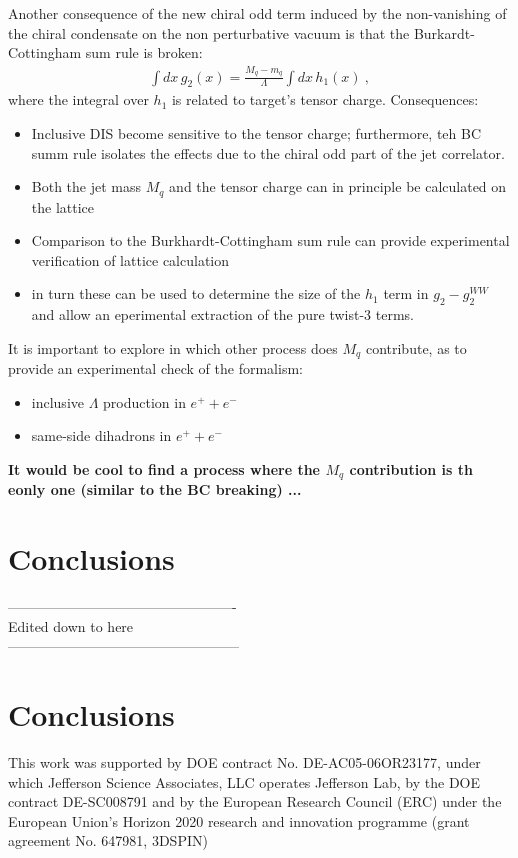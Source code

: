 \documentclass[preprintnumbers,floatfix,nofootinbib]{revtex4}
\newcommand{\todo}[1]{\marginpar{$\bullet$}\textbf{#1}}
\newcommand{\mj}{M_q}
\begin{document}
Another consequence of the new chiral odd term induced by the non-vanishing of
the chiral condensate on the non perturbative vacuum is that the
Burkardt-Cottingham sum rule is broken: 
\begin{align}
  \label{eq:BC}
  \int dx\, g_2(x) = \frac{\mj-m_q}{\Lambda} \int dx\, h_1(x) \ ,
\end{align}
where the integral over $h_1$ is related to target's tensor charge.
Consequences:
\begin{itemize}
\item Inclusive DIS become sensitive to the tensor charge; furthermore, teh BC summ rule isolates the effects due to the chiral odd part of the jet correlator. 
\item Both the jet mass $\mj$ and the tensor charge can in principle be calculated on the lattice
\item Comparison to the Burkhardt-Cottingham sum rule can provide experimental verification of lattice calculation
\item in turn these can be used to determine the size of the $h_1$ term in $g_2-g_2^{WW}$ and allow an eperimental extraction of the pure twist-3 terms.
\end{itemize}

It is important to explore in which other process does $\mj$ contribute, as to provide an experimental check of the formalism:
\begin{itemize}
\item inclusive $\Lambda$ production in $e^+ + e^-$
\item same-side dihadrons in $e^+ + e^-$ 
\end{itemize}
\todo{It would be cool to find a process where the $\mj$ contribution is th eonly one (similar to the BC breaking) ...}   


\section{Conclusions}

\noindent
------------------------------------------------- \\
Edited down to here\\
--------------------------------------------------\\


\section{Conclusions}



\begin{acknowledgments}
This work was supported by DOE contract No. DE-AC05-06OR23177,
under which Jefferson Science Associates, LLC operates Jefferson Lab, by the DOE contract DE-SC008791 and 
by the European Research Council (ERC) under the European Union's 
Horizon 2020 research and innovation programme (grant agreement No. 647981,
3DSPIN)
\end{acknowledgments}




\end{document}
